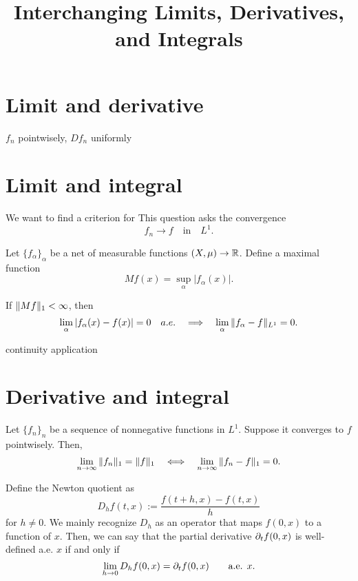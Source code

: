 \documentclass{../exp}
\title{Interchanging Limits, Derivatives, and Integrals}
\begin{document}
\maketitle

\section{Limit and derivative}

$f_n$ pointwisely, $Df_n$ uniformly








\section{Limit and integral}
We want to find a criterion for 
This question asks the convergence
\[f_n\to f\quad\text{in}\quad L^1.\]

\begin{thm}
Let $\{f_\alpha\}_\alpha$ be a net of measurable functions $(X,\mu)\to\R$.
Define a maximal function
\[Mf(x)=\sup_\alpha|f_\alpha(x)|.\]

If $\|Mf\|_1<\infty$, then
\[\lim_\alpha|f_\alpha(x)-f(x)|=0\quad a.e.\impl\lim_\alpha\|f_\alpha-f\|_{L^1}=0.\]
\end{thm}

continuity application








\section{Derivative and integral}

\begin{thm}[Scheffe]
Let $\{f_n\}_n$ be a sequence of nonnegative functions in $L^1$.
Suppose it converges to $f$ pointwisely.
Then,
\[\lim_{n\to\oo}\|f_n\|_1=\|f\|_1\iff\lim_{n\to\oo}\|f_n-f\|_1=0.\]
\end{thm}

Define the Newton quotient as
\[D_hf(t,x):=\frac{f(t+h,x)-f(t,x)}h\]
for $h\ne0$.
We mainly recognize $D_h$ as an operator that maps $f(0,x)$ to a function of $x$.
Then, we can say that the partial derivative $\pd_tf(0,x)$ is well-defined a.e. $x$ if and only if
\[\lim_{h\to0}D_hf(0,x)=\pd_tf(0,x)\qquad\text{a.e. }x.\]
\end{document}

